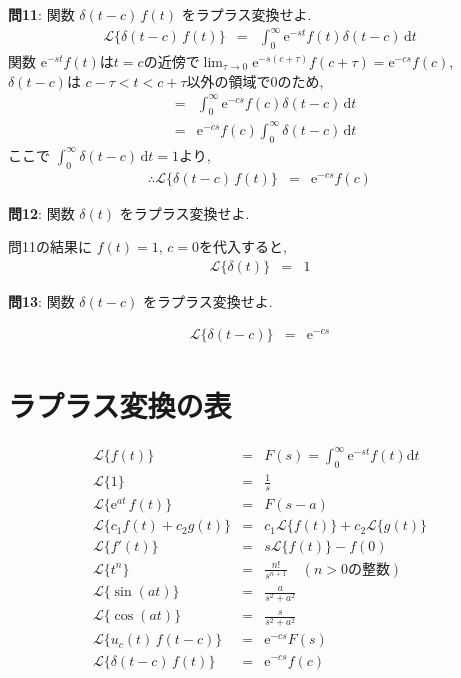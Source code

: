 ﻿\documentclass[a4j]{jarticle}
\begin{document}
\noindent
{\large {\bf 問11}}: 関数 \( \delta(t-c)\,f(t) \) をラプラス変換せよ.
\begin{eqnarray*}
\mathcal{L} \{ \delta(t-c)\,f(t) \} &=& \int_{0}^{\infty}{ \mathrm{e}^{-st}f(t)\delta(t-c) \, \mathrm{d}t}
\end{eqnarray*}
%
関数 \( \mathrm{e}^{-st}f(t) \text{は} t=c \text{の近傍で} \lim_{\tau \to 0}\mathrm{e}^{-s(c+\tau)}f(c+\tau) = \mathrm{e}^{-cs}f(c) \),
\( \delta(t-c) \)は \( c-\tau <t < c+\tau \)以外の領域で0のため, 
%
\begin{eqnarray*}
&=& \int_{0}^{\infty}{ \mathrm{e}^{-cs}f(c)\delta(t-c) \, \mathrm{d}t} \\
&=& \mathrm{e}^{-cs}f(c)\int_{0}^{\infty}{ \delta(t-c) \, \mathrm{d}t}
\end{eqnarray*}
ここで \( \int_{0}^{\infty}{ \delta(t-c) \, \mathrm{d}t } = 1 \)より,
\begin{eqnarray*}
\therefore \mathcal{L} \{ \delta(t-c)\,f(t) \} &=& \mathrm{e}^{-cs}f(c)
\end{eqnarray*}

\noindent
{\large {\bf 問12}}: 関数 \( \delta(t) \) をラプラス変換せよ.

問11の結果に \( f(t) = 1 ,\, c=0 \)を代入すると,
\begin{eqnarray*}
\mathcal{L} \{ \delta(t) \} &=& 1
\end{eqnarray*}

\noindent
{\large {\bf 問13}}: 関数 \( \delta(t-c) \) をラプラス変換せよ.

\begin{eqnarray*}
\mathcal{L} \{ \delta(t-c) \} &=& \mathrm{e}^{-cs}
\end{eqnarray*}

\section{ラプラス変換の表}
%
\begin{eqnarray*}
                 \mathcal{L} \{ f(t) \} &=& F(s) = \int_0^\infty \mathrm{e}^{-st}f(t)\mathrm{d}t \\
                    \mathcal{L} \{ 1 \} &=& \frac{1}{s} \\
\mathcal{L} \{ \mathrm{e}^{at}\,f(t) \} &=& F(s-a) \\
 \mathcal{L} \{  c_1 f(t) + c_2 g(t) \} &=& c_1 \mathcal{L} \{ f(t) \} + c_2 \mathcal{L} \{ g(t) \} \\
               \mathcal{L} \{  f'(t) \} &=& s \mathcal{L} \{  f(t) \} - f(0) \\
                  \mathcal{L} \{ t^n \} &=& \frac{n!}{s^{n+1}} \quad (n > 0 \text{の整数} ) \\
             \mathcal{L} \{ \sin(at) \} &=& \frac{a}{s^2 + a^2} \\
             \mathcal{L} \{ \cos(at) \} &=& \frac{s}{s^2 + a^2} \\
       \mathcal{L} \{ u_c(t)\,f(t-c) \} &=& \mathrm{e}^{-cs}F(s) \\
    \mathcal{L} \{ \delta(t-c)\,f(t) \} &=& \mathrm{e}^{-cs}f(c) \\
\end{eqnarray*}
\end{document}
